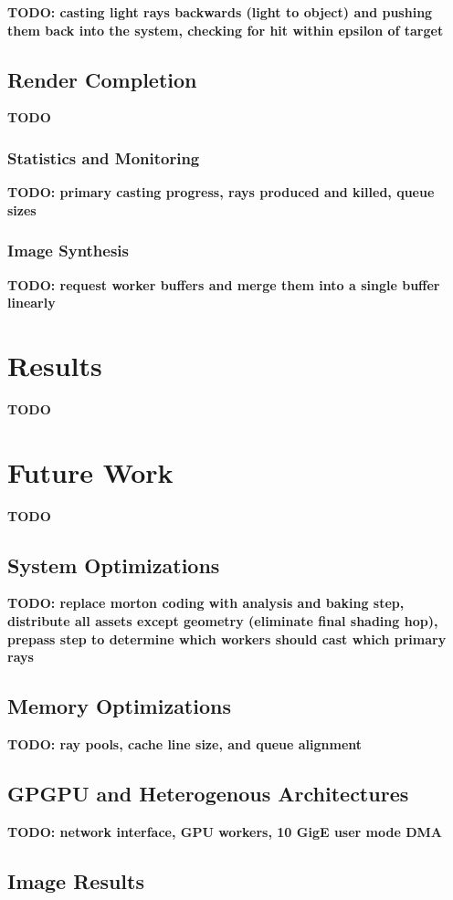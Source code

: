 \documentclass[12pt]{ucthesis}
\begin{document}
\textbf{TODO: casting light rays backwards (light to object) and pushing them back into the system, checking for hit within epsilon of target}

\section{Render Completion}
\label{completion}

\textbf{TODO}

\subsection{Statistics and Monitoring}
\label{stats}

\textbf{TODO: primary casting progress, rays produced and killed, queue sizes}

\subsection{Image Synthesis}
\label{synthesis}

\textbf{TODO: request worker buffers and merge them into a single buffer linearly}

\chapter{Results}
\label{results}

\textbf{TODO}

\chapter{Future Work}
\label{futurework}

\textbf{TODO}

\section{System Optimizations}
\label{optimizations}

\textbf{TODO: replace morton coding with analysis and baking step, distribute all assets except geometry (eliminate final shading hop), prepass step to determine which workers should cast which primary rays}

\section{Memory Optimizations}
\label{memory}

\textbf{TODO: ray pools, cache line size, and queue alignment}

\section{GPGPU and Heterogenous Architectures}
\label{hetergenous}

\textbf{TODO: network interface, GPU workers, 10 GigE user mode DMA}

\clearpage



\section*{Image Results}
\end{document}

